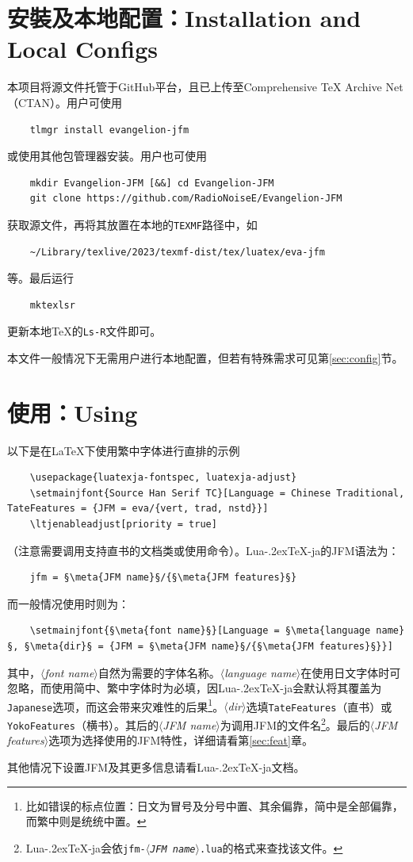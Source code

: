\documentclass{ltjsarticle}
\def\meta#1{{\normalfont\rmfamily\itshape$\langle$#1\/$\rangle$}}
\def\段{\par}
\def\LuaTeX{Lua\kern-.2ex\TeX}
\begin{document}
\section{安裝及本地配置：Installation and Local Configs}
本项目将源文件托管于GitHub平台，且已上传至Comprehensive \TeX{} Archive Net（CTAN）。用户可使用
\begin{lstlisting}
    tlmgr install evangelion-jfm
\end{lstlisting}
或使用其他包管理器安装。用户也可使用
\begin{lstlisting}
    mkdir Evangelion-JFM [&&] cd Evangelion-JFM
    git clone https://github.com/RadioNoiseE/Evangelion-JFM
\end{lstlisting}
获取源文件，再将其放置在本地的\texttt{TEXMF}路径中，如
\begin{lstlisting}
    ~/Library/texlive/2023/texmf-dist/tex/luatex/eva-jfm
\end{lstlisting}
等。最后运行
\begin{lstlisting}
    mktexlsr
\end{lstlisting}
更新本地\TeX{}的\texttt{Ls-R}文件即可。\段
本文件一般情况下无需用户进行本地配置，但若有特殊需求可见第\ref{sec:config}节。

\section{使用：Using}
以下是在\LaTeX{}下使用繁中字体进行直排的示例
\begin{lstlisting}
    \usepackage{luatexja-fontspec, luatexja-adjust}
    \setmainjfont{Source Han Serif TC}[Language = Chinese Traditional, TateFeatures = {JFM = eva/{vert, trad, nstd}}]
    \ltjenableadjust[priority = true]
\end{lstlisting}
（注意需要调用支持直书的文档类或使用\texttt{\string\tate}命令）。\LuaTeX-ja的JFM语法为：
\begin{lstlisting}
    jfm = §\meta{JFM name}§/{§\meta{JFM features}§}
\end{lstlisting}
而一般情况使用\texttt{\string\setmainjfont}时则为：
\begin{lstlisting}
    \setmainjfont{§\meta{font name}§}[Language = §\meta{language name}§, §\meta{dir}§ = {JFM = §\meta{JFM name}§/{§\meta{JFM features}§}}]
\end{lstlisting}
其中，\meta{font name}自然为需要的字体名称。\meta{language name}在使用日文字体时可忽略，而使用简中、繁中字体时为必填，因\LuaTeX-ja会默认将其覆盖为\texttt{Japanese}选项，而这会带来灾难性的后果\footnote{比如错误的标点位置：日文为冒号及分号中置、其余偏靠，简中是全部偏靠，而繁中则是统统中置。}。\meta{dir}选填\texttt{TateFeatures}（直书）或\texttt{YokoFeatures}（横书）。其后的\meta{JFM name}为调用JFM的文件名\footnote{\LuaTeX-ja会依\texttt{jfm-\meta{JFM name}.lua}的格式来查找该文件。}。最后的\meta{JFM features}选项为选择使用的JFM特性，详细请看第\ref{sec:feat}章。\段
其他情况下设置JFM及其更多信息请看\LuaTeX-ja文档\cite{luatexja-doc}。
\end{document}
